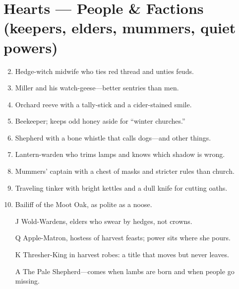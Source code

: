 \section*{Hearts --- People \& Factions (keepers, elders, mummers, quiet powers)}
\label{sec:aelaerem-people}
\begin{enumerate}
\setcounter{enumi}{1}
\item Hedge-witch midwife who ties red thread and unties feuds.
\item Miller and his watch-geese---better sentries than men.
\item Orchard reeve with a tally-stick and a cider-stained smile.
\item Beekeeper; keeps odd honey aside for ``winter churches.''
\item Shepherd with a bone whistle that calls dogs---and other things.
\item Lantern-warden who trims lamps and knows which shadow is wrong.
\item Mummers' captain with a chest of masks and stricter rules than church.
\item Traveling tinker with bright kettles and a dull knife for cutting oaths.
\item Bailiff of the Moot Oak, as polite as a noose.
\item[J] Wold-Wardens, elders who swear by hedges, not crowns.
\item[Q] Apple-Matron, hostess of harvest feasts; power sits where she pours.
\item[K] Thresher-King in harvest robes: a title that moves but never leaves.
\item[A] The Pale Shepherd---comes when lambs are born and when people go missing.
\end{enumerate}


